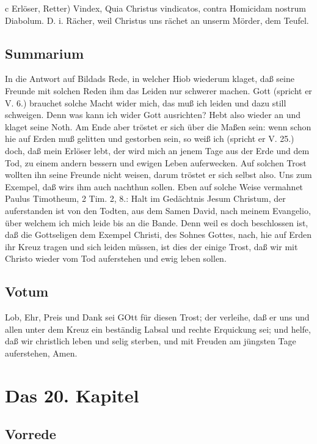 c Erlöser, Retter) Vindex, Quia Christus vindicatos, contra Homicidam nostrum Diabolum. D. i. Rächer, weil Christus uns rächet an unserm Mörder, dem Teufel.

\section{Summarium}

In die Antwort auf Bildads Rede, in welcher Hiob wiederum klaget, daß seine Freunde mit solchen Reden ihm das Leiden nur schwerer machen. Gott (spricht er V. 6.) brauchet solche Macht wider mich, das muß ich leiden und dazu still schweigen. Denn was kann ich wider Gott
ausrichten? Hebt also wieder an und klaget seine Noth. Am Ende aber tröstet er sich über die Maßen sein: wenn schon hie auf Erden muß gelitten und gestorben sein, so weiß ich (spricht er V. 25.) doch, daß mein Erlöser lebt, der wird mich an jenem Tage aus der Erde und dem Tod, zu einem andern bessern und ewigen Leben auferwecken. Auf solchen Trost wollten ihn seine Freunde nicht weisen, darum tröstet er sich selbst also. Uns zum Exempel, daß wirs ihm auch nachthun sollen. Eben auf solche Weise vermahnet Paulus Timotheum, 2 Tim. 2, 8.: Halt im Gedächtnis Jesum Christum, der auferstanden ist von den Todten, aus dem Samen David, nach meinem Evangelio, über welchem ich mich leide bis an die Bande. Denn weil es doch beschlossen ist, daß die Gottseligen dem Exempel Christi, des Sohnes Gottes, nach, hie auf Erden ihr Kreuz tragen und sich leiden müssen, ist dies der einige Trost, daß wir mit Christo wieder vom Tod auferstehen und ewig leben sollen.

\section{Votum}

Lob, Ehr, Preis und Dank sei GOtt für diesen Trost; der verleihe, daß er uns und allen unter dem Kreuz ein beständig Labsal und rechte Erquickung sei; und helfe, daß wir christlich leben und selig sterben, und mit Freuden am jüngsten Tage auferstehen, Amen.

\chapter{Das 20. Kapitel}

\section{Vorrede}

